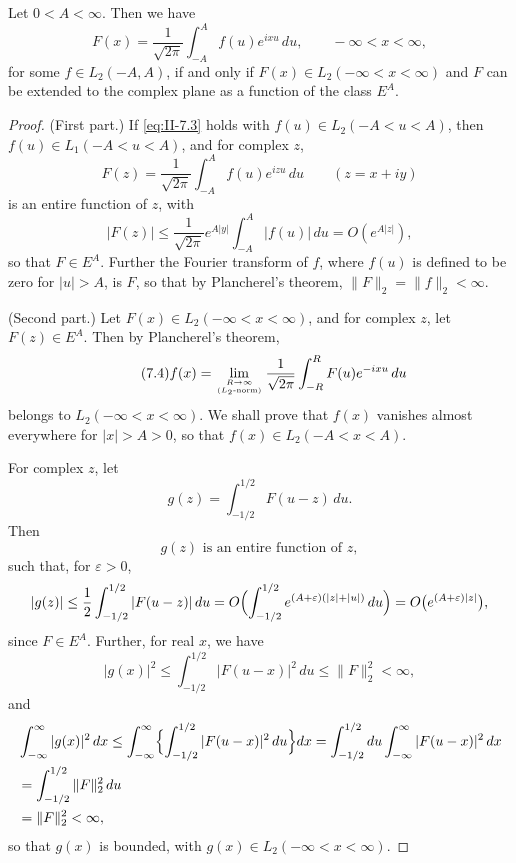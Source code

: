 \begin{theorem}\label{thm:II-10}
Let $0<A<\infty$. Then we have
\begin{equation}\tag{7.3}\label{eq:II-7.3}
F(x)=\frac{1}{\sqrt{2\pi}}\int_{-A}^{A}f(u)e^{ixu}\,du,\qquad-\infty<x<\infty,
\end{equation}
for some $f\in L_{2}(-A,A)$, if and only if $F(x)\in L_{2}(-\infty<x<\infty)$ and $F$ can be extended to the complex plane as a function of the class $E^{A}$.
\end{theorem}
\begin{proof}
(First part.) If \eqref{eq:II-7.3} holds with $f(u)\in L_{2}(-A<u<A)$, then $f(u)\in L_{1}(-A<u<A)$, and for complex $z$,
\[
F(z)=\frac{1}{\sqrt{2\pi}}\int_{-A}^{A}f(u)e^{izu}\,du\qquad(z=x+iy)
\]
is an entire function of $z$, with
\[
|F(z)|\le\frac{1}{\sqrt{2\pi}}e^{A|y|}\int_{-A}^{A}|f(u)|\,du=O(e^{A|z|}),
\]
so that $F\in E^{A}$. Further the Fourier transform of $f$, where $f(u)$ is defined to be zero for $|u|>A$, is $F$, so that by Plancherel's theorem, $\|F\|_{2}=\|f\|_{2}<\infty$.

(Second part.) Let $F(x)\in L_{2}(-\infty<x<\infty)$, and for complex $z$, let $F(z)\in E^{A}$. Then by Plancherel's theorem,
\begin{equation}\tag{7.4}\label{eq:II-7.4}
f(x)=\lim_{R\to\infty\atop(L_{2}\text{-norm})}\frac{1}{\sqrt{2\pi}}\int_{-R}^{R}F(u)e^{-ixu}\,du
\end{equation}
belongs to $L_{2}(-\infty<x<\infty)$. We shall prove that $f(x)$ vanishes almost everywhere for $|x|>A>0$, so that $f(x)\in L_{2}(-A<x<A)$.

For complex $z$, let
\begin{equation}\tag{7.5}\label{eq:II-7.5}
g(z)=\int_{-1/2}^{1/2}F(u-z)\,du.
\end{equation}
Then
\begin{equation}\tag{7.6}\label{eq:II-7.6}
g(z)\text{ is an entire function of }z,
\end{equation}
such that, for $\varepsilon>0$,
\[
|g(z)|\le\frac{1}{2}\int_{-1/2}^{1/2}|F(u-z)|\,du
=O\Bigl(\int_{-1/2}^{1/2}e^{(A+\varepsilon)(|z|+|u|)}\,du\Bigr)
=O\bigl(e^{(A+\varepsilon)|z|}\bigr),
\]
since $F\in E^{A}$. Further, for real $x$, we have
\begin{equation}\tag{7.7}\label{eq:II-7.7}
|g(x)|^{2}\le\int_{-1/2}^{1/2}|F(u-x)|^{2}\,du\le \|F\|_{2}^{2}<\infty,
\end{equation}
and
\[
\begin{aligned}
&\int_{-\infty}^{\infty}|g(x)|^{2}\,dx
\le\int_{-\infty}^{\infty}\Bigl\{\int_{-1/2}^{1/2}|F(u-x)|^{2}\,du\Bigr\}dx = \int_{-1/2}^{1/2}du\int_{-\infty}^{\infty}|F(u-x)|^{2}\,dx\\
&= \int_{-1/2}^{1/2}\|F\|_{2}^{2}\,du\\
&= \|F\|_{2}^{2}<\infty,
\end{aligned}
\]
so that $g(x)$ is bounded, with $g(x)\in L_{2}(-\infty<x<\infty)$.


\end{proof}
